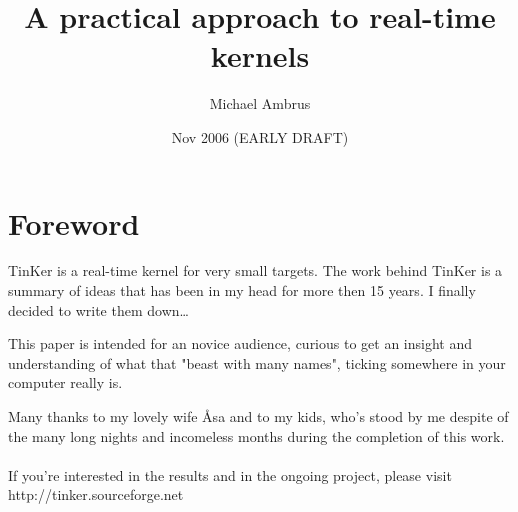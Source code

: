 \documentclass[a4paper,10pt]{book}
\begin{document}
\title{A practical approach to real-time kernels}
\author{Michael Ambrus} 
\date{Nov 2006 (EARLY DRAFT)}
\maketitle


\chapter{Foreword}
\label{FIXME}
	TinKer is a real-time kernel for very small targets. The work behind TinKer is a summary of ideas that has been in my head for more then 15 years. I finally decided to write them down\ldots

	This paper is intended for an novice audience, curious to get an insight and understanding of what that "beast with many names", ticking somewhere in your computer really is.

	Many thanks to my lovely wife \AA sa and to my kids, who's stood by me despite of the many long nights and incomeless months during the completion of this work.
\\\\
	If you're interested in the results and in the ongoing project, please visit http://tinker.sourceforge.net

\tableofcontents
\mainmatter

\listoffigures 
\listoftables
\end{document}

